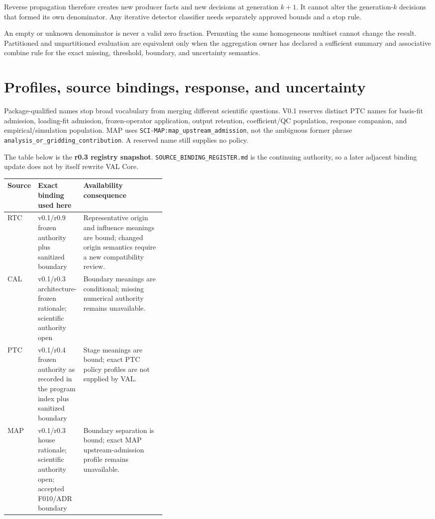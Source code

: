 \documentclass[10pt]{article}
\begin{document}
Reverse propagation therefore creates new producer facts and new decisions at
generation $k+1$. It cannot alter the generation-$k$ decisions that formed its
own denominator. Any iterative detector classifier needs separately approved
bounds and a stop rule.

An empty or unknown denominator is never a valid zero fraction. Permuting the
same homogeneous multiset cannot change the result. Partitioned and
unpartitioned evaluation are equivalent only when the aggregation owner has
declared a sufficient summary and associative combine rule for the exact
missing, threshold, boundary, and uncertainty semantics.

\clearpage
\section{Profiles, source bindings, response, and uncertainty}
\label{sec:rat-profiles}

Package-qualified names stop broad vocabulary from merging different
scientific questions. V0.1 reserves distinct PTC names for basis-fit
admission, loading-fit admission, frozen-operator application, output
retention, coefficient/QC population, response companion, and
empirical/simulation population. MAP uses
\texttt{SCI-MAP:map\_upstream\_admission}, not the ambiguous former phrase
\texttt{analysis\_or\_gridding\_contribution}. A reserved name still supplies
no policy.

The table below is the \textbf{r0.3 registry snapshot}.
\texttt{SOURCE\_BINDING\_REGISTER.md} is the continuing authority, so a later
adjacent binding update does not by itself rewrite VAL Core.

\begin{center}
\small
\begin{tabularx}{\linewidth}{@{}p{0.13\linewidth}p{0.24\linewidth}X@{}}
\toprule
Source & Exact binding used here & Availability consequence \\
\midrule
RTC & v0.1/r0.9 frozen authority plus sanitized boundary & Representative
origin and influence meanings are bound; changed origin semantics require a
new compatibility review. \\
CAL & v0.1/r0.3 architecture-frozen rationale; scientific authority open &
Boundary meanings are conditional; missing numerical authority remains
unavailable. \\
PTC & v0.1/r0.4 frozen authority as recorded in the program index plus
sanitized boundary & Stage meanings are bound; exact PTC policy profiles are
not supplied by VAL. \\
MAP & v0.1/r0.3 house rationale; scientific authority open; accepted F010/ADR
boundary & Boundary separation is bound; exact MAP upstream-admission profile
remains unavailable. \\
\bottomrule
\end{tabularx}
\end{center}
\end{document}
